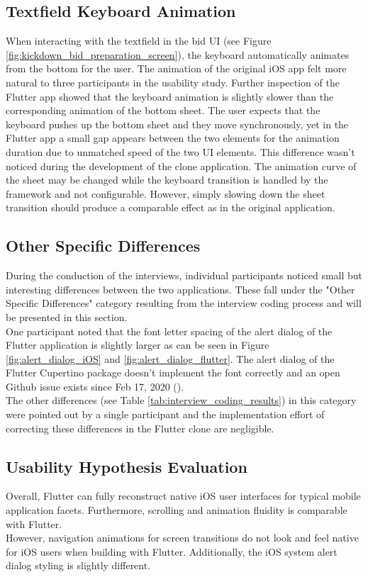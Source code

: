 \subsection{Textfield Keyboard Animation}
When interacting with the textfield in the bid UI (see Figure \ref{fig:kickdown_bid_preparation_screen}), the keyboard automatically animates from the bottom for the user. The animation of the original iOS app felt more natural to three participants in the usability study. 
Further inspection of the Flutter app showed that the keyboard animation is slightly slower than the corresponding animation of the bottom sheet. The user expects that the keyboard pushes up the bottom sheet and they move synchronously, yet in the
Flutter app a small gap appears between the two elements for the animation duration due to unmatched speed of the two UI elements.
This difference wasn't noticed during the development of the clone application. The animation curve of the sheet may be changed while the keyboard transition is handled by the framework and not configurable. However, simply slowing
down the sheet transition should produce a comparable effect as in the original application.

\subsection{Other Specific Differences}
During the conduction of the interviews, individual participants noticed small but interesting differences between the two applications. These fall under the "Other Specific Differences" category resulting from the interview coding process and will be presented in this section.\\
One participant noted that the font letter spacing of the alert dialog of the Flutter application is slightly larger as can be seen in Figure \ref{fig:alert_dialog_iOS} and \ref{fig:alert_dialog_flutter}. 
The alert dialog of the Flutter Cupertino package doesn't implement the font correctly and an open Github issue exists since Feb 17, 2020 (\cite{FlutterCommunity2020}).\\
The other differences (see Table \ref{tab:interview_coding_results}) in this category were pointed out by a single participant and the implementation effort of correcting these differences in the Flutter clone are negligible.

\subsection{Usability Hypothesis Evaluation} \label{subsection::usability_hypothesis_evaluation}
Overall, Flutter can fully reconstruct native iOS user interfaces for typical mobile application facets. Furthermore, scrolling and animation fluidity is comparable with Flutter.\\
However, navigation animations for screen transitions
do not look and feel native for iOS users when building with Flutter. Additionally, the iOS system alert dialog styling is slightly different.

